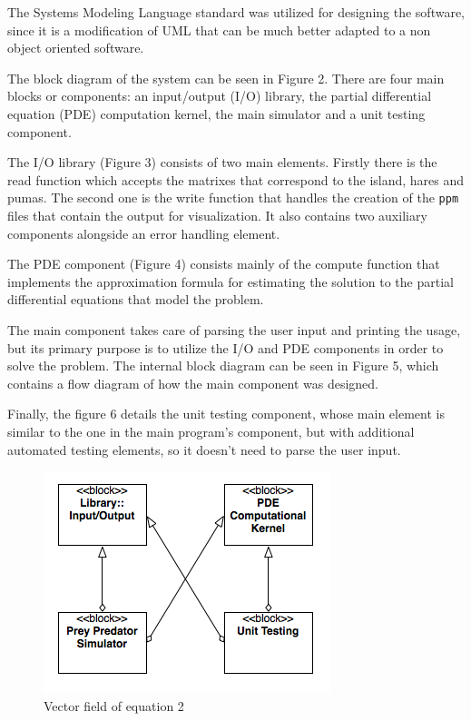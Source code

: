 \documentclass[12pt,a4paper]{article}
\begin{document}
The Systems Modeling Language standard was utilized for designing the software, since it is a modification of UML that can be much better adapted to a non object oriented software. 

The block diagram of the system can be seen in Figure 2. There are four main blocks or components: an input/output (I/O) library, the partial differential equation (PDE) computation kernel, the main simulator and a unit testing component.

The I/O library (Figure 3) consists of two main elements. Firstly there is the read function which accepts the matrixes that correspond to the island, hares and pumas. The second one is the write function that handles the creation of the \texttt{ppm} files that contain the output for visualization. It also contains two auxiliary components alongside an error handling element.

The PDE component (Figure 4) consists mainly of the compute function that implements the approximation formula for estimating the solution to the partial differential equations that model the problem.

The main component takes care of parsing the user input and printing the usage, but its primary purpose is to utilize the I/O and PDE components in order to solve the problem. The internal block diagram can be seen in Figure 5, which contains a flow diagram of how the main component was designed.

Finally, the figure 6 details the unit testing component, whose main element is similar to the one in the main program's component, but with additional automated testing elements, so it doesn't need to parse the user input.


\begin{figure}[hb]
    \centering
    \includegraphics[scale=0.6]{images/blockdesign.png}
    \caption{Vector field of equation 2}
\end{figure}
\end{document}
